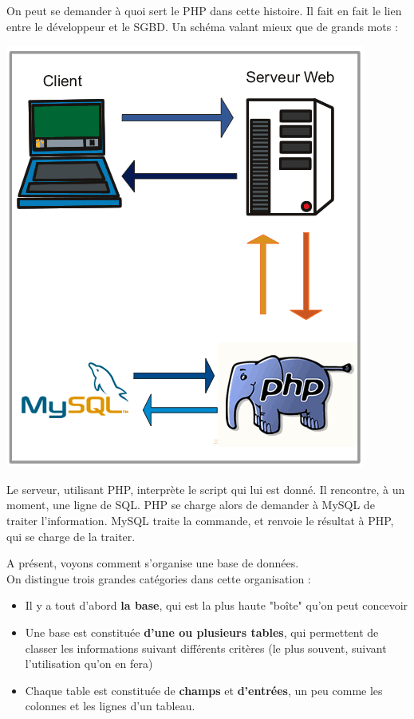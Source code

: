 \documentclass{article}
\begin{document}
\bigskip
On peut se demander à quoi sert le PHP dans cette histoire. Il fait en fait le lien entre le développeur et le SGBD. Un schéma valant mieux que de grands mots :\\
\begin{center}\includegraphics[scale=0.5]{schema2.png}\end{center}
Le serveur, utilisant PHP, interprète le script qui lui est donné. Il rencontre, à un moment, une ligne de SQL. PHP se charge alors de demander à MySQL de traiter l'information. MySQL traite la commande, et renvoie le résultat à PHP, qui se charge de la traiter. 

\bigskip
A présent, voyons comment s'organise une base de données. \\
On distingue trois grandes catégories dans cette organisation :
\begin{itemize}
	\item Il y a tout d'abord \textbf{la base}, qui est la plus haute "boîte" qu'on peut concevoir
	\item Une base est constituée \textbf{d'une ou plusieurs tables}, qui permettent de classer les informations suivant différents critères (le plus souvent, suivant l'utilisation qu'on en fera)
	\item Chaque table est constituée de \textbf{champs} et \textbf{d'entrées}, un peu comme les colonnes et les lignes d'un tableau. 
\end{itemize}
\end{document}
